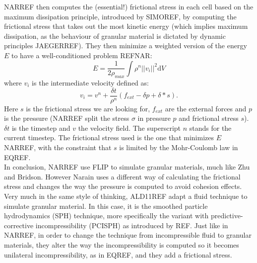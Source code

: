NARREF then computes the (essential!) frictional stress in each cell based on the maximum dissipation principle, introduced by SIMOREF, by computing the frictional stress that takes out the most kinetic energy (which implies maximum dissipation, as the behaviour of granular material is dictated by dynamic principles JAEGERREF). They then minimize a weighted version of the energy $E$ to have a well-conditioned problem REFNAR:
\begin{equation}
E = \frac{1}{2 \rho_{max}} \int \rho^n ||v_i||^2 \mathrm{d}V
\end{equation} 
where $v_i$ is the intermediate velocity defined as:
\begin{equation}
v_i = v^n + \frac{\delta t}{\rho^n} (f_{ext} - \delta p + \delta * s).
\end{equation}
Here $s$ is the frictional stress we are looking for, $f_{ext}$ are the external forces and $p$ is the pressure (NARREF split the stress $\sigma$ in pressure $p$ and frictional stress $s$). $\delta t$ is the timestep and $v$ the velocity field. The superscript $n$ stands for the current timestep. The frictional stress used is the one that minimizes $E$ NARREF, with the constraint that $s$ is limited by the Mohr-Coulomb law in EQREF.\\

In conclusion, NARREF use FLIP to simulate granular materials, much like Zhu and Bridson. However Narain uses a different way of calculating the frictional stress and changes the way the pressure is computed to avoid cohesion effects.\\

Very much in the same style of thinking, ALD11REF adapt a fluid technique to simulate granular material. In this case, it is the smoothed particle hydrodynamics (SPH) technique, more specifically the variant with predictive-corrective incompressibility (PCISPH) as introduced by REF. Just like in NARREF, in order to change the technique from incompressible fluid to granular materials, they alter the way the incompressibility is computed so it becomes unilateral incompressibility, as in EQREF, and they add a frictional stress.\\

